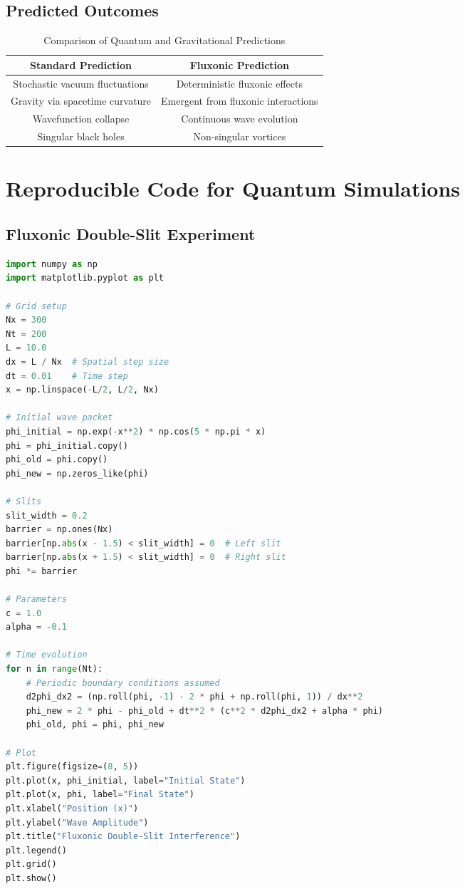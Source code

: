 \documentclass{article}
\begin{document}
\subsection{Predicted Outcomes}
\begin{table}[h]
    \centering
    \begin{tabular}{|c|c|}
        \hline
        \textbf{Standard Prediction} & \textbf{Fluxonic Prediction} \\
        \hline
        Stochastic vacuum fluctuations & Deterministic fluxonic effects \\
        Gravity via spacetime curvature & Emergent from fluxonic interactions \\
        Wavefunction collapse & Continuous wave evolution \\
        Singular black holes & Non-singular vortices \\
        \hline
    \end{tabular}
    \caption{Comparison of Quantum and Gravitational Predictions}
    \label{tab:predictions}
\end{table}

\section{Reproducible Code for Quantum Simulations}
\subsection{Fluxonic Double-Slit Experiment}
\begin{lstlisting}[language=Python, caption=Fluxonic Double-Slit Experiment, label=lst:doubleslit]
import numpy as np
import matplotlib.pyplot as plt

# Grid setup
Nx = 300
Nt = 200
L = 10.0
dx = L / Nx  # Spatial step size
dt = 0.01    # Time step
x = np.linspace(-L/2, L/2, Nx)

# Initial wave packet
phi_initial = np.exp(-x**2) * np.cos(5 * np.pi * x)
phi = phi_initial.copy()
phi_old = phi.copy()
phi_new = np.zeros_like(phi)

# Slits
slit_width = 0.2
barrier = np.ones(Nx)
barrier[np.abs(x - 1.5) < slit_width] = 0  # Left slit
barrier[np.abs(x + 1.5) < slit_width] = 0  # Right slit
phi *= barrier

# Parameters
c = 1.0
alpha = -0.1

# Time evolution
for n in range(Nt):
    # Periodic boundary conditions assumed
    d2phi_dx2 = (np.roll(phi, -1) - 2 * phi + np.roll(phi, 1)) / dx**2
    phi_new = 2 * phi - phi_old + dt**2 * (c**2 * d2phi_dx2 + alpha * phi)
    phi_old, phi = phi, phi_new

# Plot
plt.figure(figsize=(8, 5))
plt.plot(x, phi_initial, label="Initial State")
plt.plot(x, phi, label="Final State")
plt.xlabel("Position (x)")
plt.ylabel("Wave Amplitude")
plt.title("Fluxonic Double-Slit Interference")
plt.legend()
plt.grid()
plt.show()
\end{lstlisting}
\end{document}
